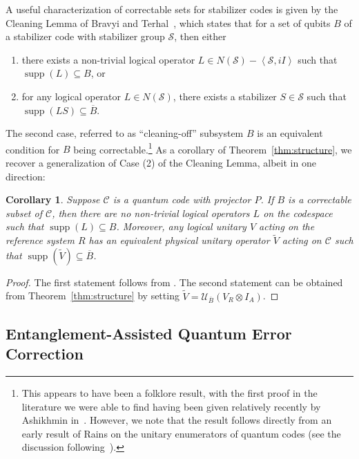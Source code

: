 \documentclass[]{amsart}
\DeclareMathOperator{\supp}{supp}
\newtheorem{corollary}[theorem]{Corollary}
\begin{document}
A useful characterization of correctable sets for stabilizer codes is given by the Cleaning Lemma of Bravyi and Terhal~\cite{BT2009}, which states that for a set of qubits $B$ of a stabilizer code with stabilizer group $\mathcal{S}$, then either
\begin{enumerate}
    \item there exists a non-trivial logical operator $L\in N\!\left(\mathcal{S}\right)-\left\langle\mathcal{S},iI\right\rangle$ such that $\supp\!\left(L\right)\subseteq B$, or
    \item for any logical operator $L\in N\!\left(\mathcal{S}\right)$, there exists a stabilizer $S\in\mathcal{S}$ such that $\supp\!\left(LS\right)\subseteq\overline{B}$.
\end{enumerate}
The second case, referred to as ``cleaning-off'' subsystem $B$ is an equivalent condition for $B$ being correctable.\footnote{This appears to have been a folklore result, with the first proof in the literature we were able to find having been given relatively recently by Ashikhmin in~\cite[Theorem 1]{Ash2020}. However, we note that the result follows directly from an early result of Rains on the unitary enumerators of quantum codes (see the discussion following~\cite[Theorem 10]{Rai1998}).}
As a corollary of Theorem~\ref{thm:structure}, we recover a generalization of Case (2) of the Cleaning Lemma, albeit in one direction:

\begin{corollary}\label{thm:genclean}
    Suppose $\mathcal{C}$ is a quantum code with projector $P$. If $B$ is a correctable subset of $\mathcal{C}$, then there are no non-trivial logical operators $L$ on the codespace such that $\supp\!\left(L\right)\subseteq B$.
    Moreover, any logical unitary $V$ acting on the reference system $R$ has an equivalent physical unitary operator $\widetilde{V}$ acting on $\mathcal{C}$ such that $\supp\!\left(\widetilde{V}\right)\subseteq \overline{B}$.
\end{corollary}
\begin{proof}
    The first statement follows from \cite[Corollary 4.8]{CHKNN2025}.
    The second statement can be obtained from Theorem~\ref{thm:structure} by setting $\widetilde{V}=\mathcal{U}_{\overline{B}}\!\left(V_R\otimes I_A\right)$.
\end{proof}

\subsection{Entanglement-Assisted Quantum Error Correction}
\end{document}
